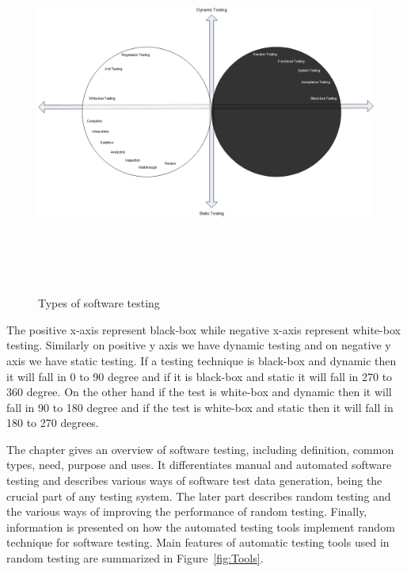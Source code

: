 \bigskip
\begin{figure}[h]
	\centering
	\centerline{\includegraphics[width=16cm, height=12cm ]{chapter2/DrawingTesting.png}}
	\bigskip
	\caption{Types of software testing}
	\label{fig:testDataGenerators_2}
\end{figure}
\bigskip

The positive x-axis represent black-box while negative x-axis represent white-box testing. Similarly on positive y axis we have dynamic testing and on negative y axis we have static testing. If a testing technique is black-box and dynamic then it will fall in 0 to 90 degree and if it is black-box and static it will fall in 270 to 360 degree. On the other hand if the test is white-box and dynamic then it will fall in 90 to 180 degree and if the test is white-box and static then it will fall in 180 to 270 degrees.

The chapter gives an overview of software testing, including definition, common types, need, purpose and uses. It differentiates manual and automated software testing and describes various ways of software test data generation, being the crucial part of any testing system. The later part describes random testing and the various ways of improving the performance of random testing. Finally, information is presented on how the automated testing tools implement random technique for software testing. Main features of automatic testing tools used in random testing are summarized in Figure~\ref{fig:Tools}.

